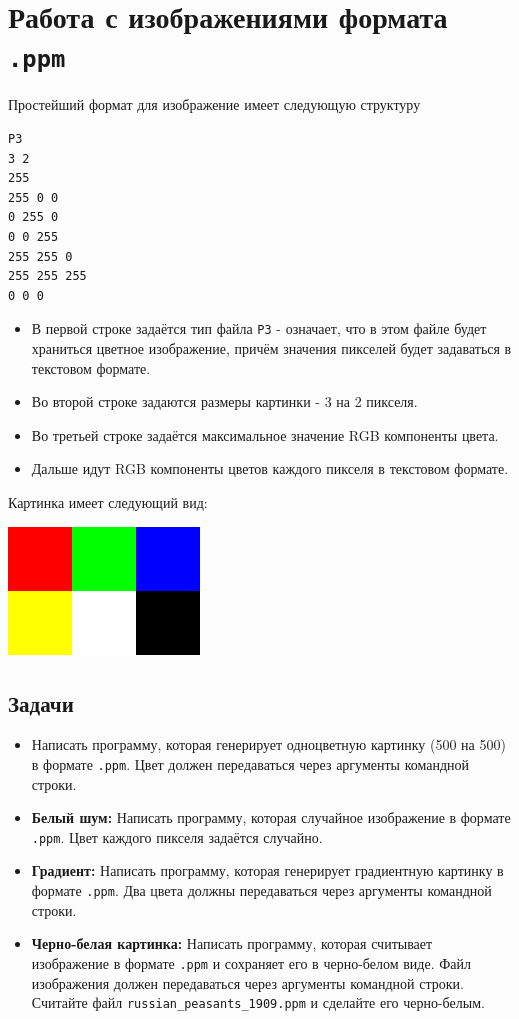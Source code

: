 \documentclass{article}
\begin{document}
\section*{Работа с изображениями формата \texttt{.ppm}}
Простейший формат для изображение имеет следующую структуру
\begin{verbatim}
P3
3 2
255
255 0 0 
0 255 0  
0 0 255 
255 255 0 
255 255 255 
0 0 0
\end{verbatim}
\begin{itemize}
\item В первой строке задаётся тип файла \texttt{P3} - означает, что в этом файле будет храниться цветное изображение, причём значения пикселей будет задаваться в текстовом формате.
\item Во второй строке задаются размеры картинки - 3 на 2 пикселя.
\item Во третьей строке задаётся максимальное значение RGB компоненты цвета.
\item Дальше идут RGB компоненты цветов каждого пикселя в текстовом формате.
\end{itemize}
Картинка имеет следующий вид:
\begin{center}
\includegraphics[scale=0.5]{../images/tiny.png}
\end{center}

\subsection*{Задачи}
\begin{itemize}
\item Написать программу, которая генерирует одноцветную картинку (500 на 500) в формате \texttt{.ppm}. Цвет должен передаваться через аргументы командной строки.
\item \textbf{Белый шум:} Написать программу, которая случайное изображение в формате \texttt{.ppm}. Цвет каждого пикселя задаётся случайно.
\item \textbf{Градиент:} Написать программу, которая генерирует градиентную картинку в формате \texttt{.ppm}. Два цвета должны передаваться через аргументы командной строки.
\item \textbf{Черно-белая картинка:} Написать программу, которая считывает изображение в формате \texttt{.ppm} и сохраняет его в черно-белом виде. Файл изображения должен передаваться через аргументы командной строки. Считайте файл \texttt{russian\_peasants\_1909.ppm} и сделайте его черно-белым.
\end{itemize}
\end{document}
